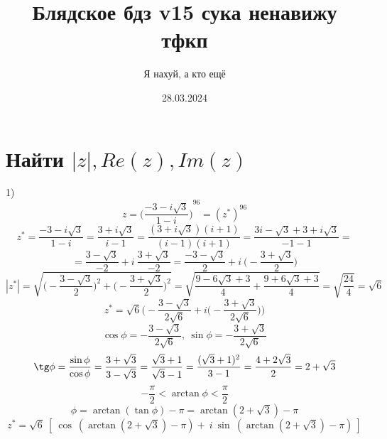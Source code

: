 \documentclass[14pt]{extarticle}
\title{Блядское бдз v15 сука ненавижу тфкп}
\author{Я нахуй, а кто ещё}
\date{28.03.2024}
\begin{document}
\maketitle
\section{Найти $|z|, Re(z), Im(z)$}
1) 
\begin{displaymath}
    z = {\Bigg(\frac{-3-i\sqrt3}{1-i}\Bigg)}^{96}=(z^*)^{96} 
\end{displaymath}
\begin{displaymath}
    z^* = \frac{-3-i\sqrt3}{1-i} = \frac{3+i\sqrt3}{i-1}=
    \frac{(3+i\sqrt3)(i+1)}{(i-1)(i+1)} = \frac{3i-\sqrt3+3+i\sqrt3}{-1-1} =
\end{displaymath}
\begin{displaymath}
    =\frac{3-\sqrt3}{-2}+i \ \frac{3+\sqrt3}{-2}=\frac{-3-\sqrt3}{2}+
    i \ \Bigg(-\frac{3+\sqrt3}{2}\Bigg)
\end{displaymath}
\begin{displaymath}
    |z^*| = \sqrt{\Bigg(-\frac{3-\sqrt3}{2}\Bigg)^2
    +\Bigg(-\frac{3+\sqrt3}{2}\Bigg)^2}=
    \sqrt{\frac{9-6\sqrt3+3}{4}+\frac{9+6\sqrt3+3}{4}}=\sqrt{\frac{24}{4}}
    =\sqrt{6}
\end{displaymath}
\begin{displaymath}
    z^*=\sqrt6\Bigg(-\frac{3-\sqrt3}{2\sqrt6}
    +i\Bigg(-\frac{3+\sqrt3}{2\sqrt6}\Bigg)\Bigg)
\end{displaymath}
\begin{displaymath}
    \cos\phi = -\frac{3-\sqrt3}{2\sqrt6}, \ 
    \sin\phi = -\frac{3+\sqrt3}{2\sqrt6}
\end{displaymath}
\begin{displaymath}
    \tg\phi = \frac{\sin\phi}{\cos\phi}=\frac{3+\sqrt3}{3-\sqrt3}
    =\frac{\sqrt3+1}{\sqrt3-1}=\frac{(\sqrt3+1)^2}{3-1}
    =\frac{4+2\sqrt{3}}{2}=2+\sqrt3
\end{displaymath}
\begin{displaymath}
    -\frac{\pi}{2} < \arctan \phi < \frac{\pi}{2}
\end{displaymath}
\begin{displaymath}
    \phi=\arctan{(\tan\phi)}-\pi=\arctan{(2+\sqrt3)}-\pi
\end{displaymath}
\begin{displaymath}
    z^*=\sqrt6 \ [\ \cos \ (\arctan{(2+\sqrt3)}-\pi)+ \ 
    i \ \sin \ (\arctan{(2+\sqrt3)}-\pi) \ ]
\end{displaymath}\\
\end{document}

